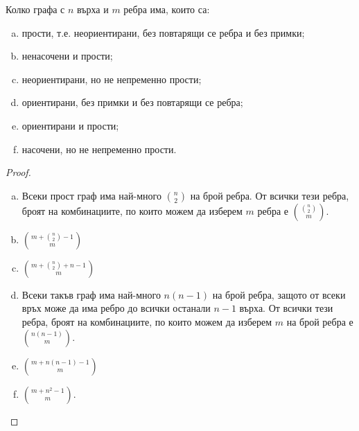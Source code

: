 \begin{problem}
  Колко графа с $n$ върха и $m$ ребра има, които са:
  \begin{enumerate}[a)]
  \item
    прости, т.е. неориентирани, без повтарящи се ребра и без примки;
  \item
    ненасочени и прости;
  \item
    неориентирани, но не непременно прости;
  \item
    ориентирани, без примки и без повтарящи се ребра;
  \item
    ориентирани и прости;
  \item
    насочени, но не непременно прости.
\end{enumerate}
\end{problem}
\begin{proof}
  \begin{enumerate}[a)]
  \item
    Всеки прост граф има най-много $\binom{n}{2}$ на брой ребра.
    От всички тези ребра, броят на комбинациите, по които можем да изберем $m$ ребра е 
    $\binom{\binom{n}{2}}{m}$.
  \item
    $\binom{m+\binom{n}{2}-1}{m}$
  \item
    $\binom{m+\binom{n}{2}+n-1}{m}$
  \item
    Всеки такъв граф има най-много $n(n-1)$ на брой ребра, защото
    от всеки връх може да има ребро до всички останали $n-1$ върха.
    От всички тези ребра, броят на комбинациите, по които можем да изберем $m$ на брой ребра е
    $\binom{n(n-1)}{m}$.
  \item
    $\binom{m+n(n-1)-1}{m}$
  \item
    $\binom{m+n^2-1}{m}$.
  \end{enumerate}
\end{proof}

